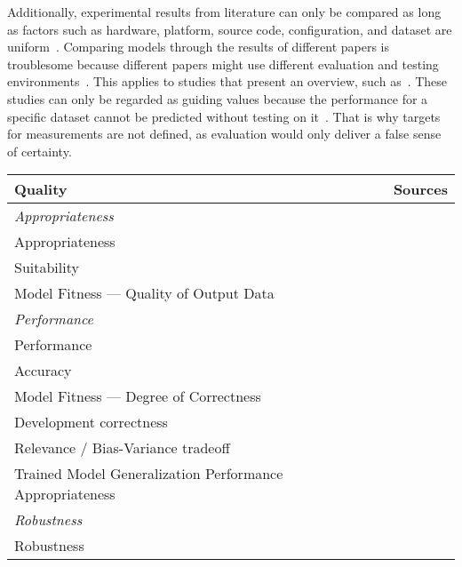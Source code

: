 Additionally, experimental results from literature can only be compared as long as factors such as
hardware, platform, source code, configuration, and dataset are uniform~\citep{arpteg_software_2018}.
Comparing models through the results of different papers is troublesome because different papers
might use different evaluation and testing environments~\citep{baek_what_2019}.
This applies to studies that present an overview, such as~\cite{chen_text_2021,long_scene_2021}.
These studies can only be regarded as guiding values because the performance for a specific dataset
cannot be predicted without testing on it~\citep{arpteg_software_2018}.
That is why targets for measurements are not defined, as evaluation would only deliver a false
sense of certainty.

\begin{table}[h]
    \centering\scriptsize
    \begin{tabular}{p{} p{}}
        \textbf{Quality} & \textbf{Sources} \\
        \toprule
        \textit{Appropriateness} \\
        Appropriateness &~\cite{siebert_construction_2021} \\
        Suitability &~\cite{siebert_construction_2021} \\
        Model Fitness --- Quality of Output Data &~\cite{nakamichi_requirements-driven_2020} \\
        \midrule
        \textit{Performance} \\
        Performance &~\cite{ashmore_assuring_2021,vogelsang_requirements_2019} \\
        Accuracy &~\cite{nakamichi_requirements-driven_2020} \\
        Model Fitness --- Degree of Correctness &~\cite{nakamichi_requirements-driven_2020,
                                                    zhang_machine_2020} \\
        Development correctness &~\cite{siebert_construction_2021} \\
        Relevance / Bias-Variance tradeoff &~\cite{siebert_construction_2021, zhang_machine_2020} \\
        Trained Model Generalization Performance Appropriateness
                                                    &~\cite{nakamichi_requirements-driven_2020} \\
        \midrule
        \textit{Robustness} \\
        Robustness &~\cite{ashmore_assuring_2021, hu_towards_2020, siebert_construction_2021} \\

\end{tabular}
\end{table}
